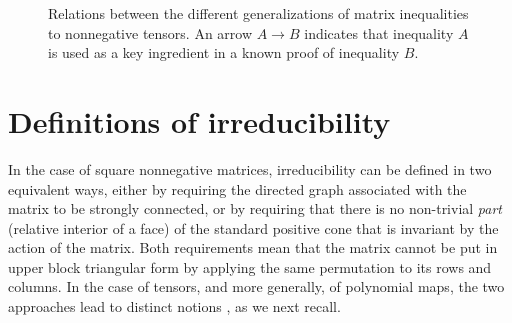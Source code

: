 \documentclass{amsart}
\newcommand{\0}{\mathbf{0}}
\newcommand{\1}{\mathbf{1}}
\theoremstyle{remark}
\numberwithin{equation}{section} %
\begin{document}
\begin{figure}
\begin{center}
\end{center}
\caption{Relations between the different generalizations of matrix inequalities to nonnegative tensors. An arrow $A\to B$ indicates that inequality $A$ is used as a key ingredient in a known proof of inequality $B$.}
\end{figure}
 \section{Definitions of irreducibility}\label{sec:defirr}
%
 In the case of square nonnegative matrices, irreducibility can be defined
 in two equivalent ways, either by requiring the directed graph
 associated with the matrix to be strongly connected,
 or by requiring that there is no non-trivial \emph{part}
 (relative interior of a face) of the standard positive cone
 that is invariant
 by the action of the matrix. Both requirements mean
%
 that the matrix cannot
 be put in upper block triangular form by applying the same permutation
 to its rows and columns. In the case of tensors, and more generally,
 of polynomial maps, the two approaches lead to distinct notions
 \cite{CPZ08,FGH}, as we next recall. 
\end{document}
